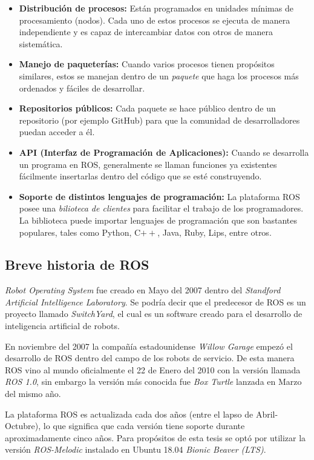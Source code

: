 \begin{itemize}
\item \textbf{Distribución de procesos:}
Están programados en unidades mínimas de procesamiento (nodos). Cada uno de estos procesos se ejecuta de manera independiente y es capaz de intercambiar datos con otros de manera sistemática.  
\item \textbf{Manejo de paqueterías:}
Cuando varios procesos tienen propósitos similares, estos se manejan dentro de un \textit{paquete} que haga los procesos más ordenados y fáciles de desarrollar.
\item \textbf{Repositorios públicos:}
Cada paquete se hace público dentro de un repositorio (por ejemplo GitHub) para que la comunidad de desarrolladores puedan acceder a él. 
\item \textbf{API (Interfaz de Programación de Aplicaciones):}
Cuando se desarrolla un programa en ROS, generalmente se llaman funciones ya existentes fácilmente insertarlas dentro del código que se esté construyendo.
\item \textbf{Soporte de distintos lenguajes de programación:}
La plataforma ROS posee una \textit{bilioteca de clientes} para facilitar el trabajo de los programadores. La biblioteca puede importar lenguajes de programación que son bastantes populares, tales como Python, C$++$, Java, Ruby, Lips, entre otros.
\end{itemize}
		\subsection*{Breve historia de ROS}
\textit{Robot Operating System} fue creado en Mayo del 2007 dentro del \textit{Standford Artificial Intelligence Laboratory}. Se podría decir que el predecesor de ROS es un proyecto llamado \textit{SwitchYard}, el cual es un software creado para el desarrollo de inteligencia artificial de robots.

En noviembre del 2007 la compañía estadounidense \textit{Willow Garage} empezó el desarrollo de ROS dentro del campo de los robots de servicio. De esta manera ROS vino al mundo oficialmente el 22 de Enero del 2010 con la versión llamada \textit{ROS 1.0}, sin embargo la versión más conocida fue \textit{Box Turtle} lanzada en Marzo del mismo año.

La plataforma ROS es actualizada cada dos años (entre el lapso de Abril-Octubre), lo que significa que cada versión tiene soporte durante aproximadamente cinco años. Para propósitos de esta tesis se optó por utilizar la versión \textit{ROS-Melodic} instalado en Ubuntu 18.04 \textit{Bionic Beaver (LTS)}.

